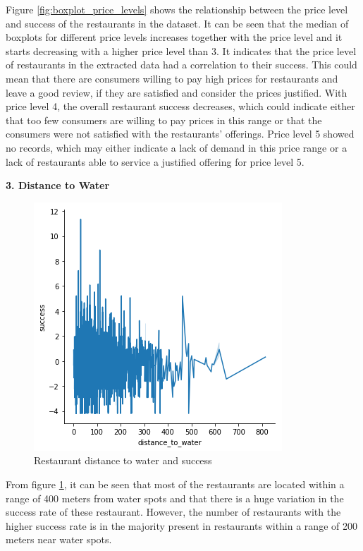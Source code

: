 \documentclass[a4paper, 11pt, oneside]{Thesis}  %
\begin{document}
Figure \ref{fig:boxplot_price_levels} shows the relationship between the price level and success of the restaurants in the dataset. It can be seen that the median of boxplots for different price levels increases together with the price level and it starts decreasing with a higher price level than 3. It indicates that the price level of restaurants in the extracted data had a correlation to their success. This could mean that there are consumers willing to pay high prices for restaurants and leave a good review, if they are satisfied and consider the prices justified. With price level 4, the overall restaurant success decreases, which could indicate either that too few consumers are willing to pay prices in this range or that the consumers were not satisfied with the restaurants’ offerings. Price level 5 showed no records, which may either indicate a lack of demand in this price range or a lack of restaurants able to service a justified offering for price level 5.

\textbf{3.	Distance to Water}
 
\begin{figure}[h]
\includegraphics[scale=0.7]{Figures/Exploratory/lineplot_distance_to_water.png}
\centering
\caption{Restaurant distance to water and success}
\label{fig:lineplot_distance_to_water}
\end{figure}
 
From figure \ref{fig:lineplot_distance_to_water}, it can be seen that most of the restaurants are located within a range of 400 meters from water spots and that there is a huge variation in the success rate of these restaurant. However, the number of restaurants with the higher success rate is in the majority present in restaurants within a range of 200 meters near water spots.
\end{document}

